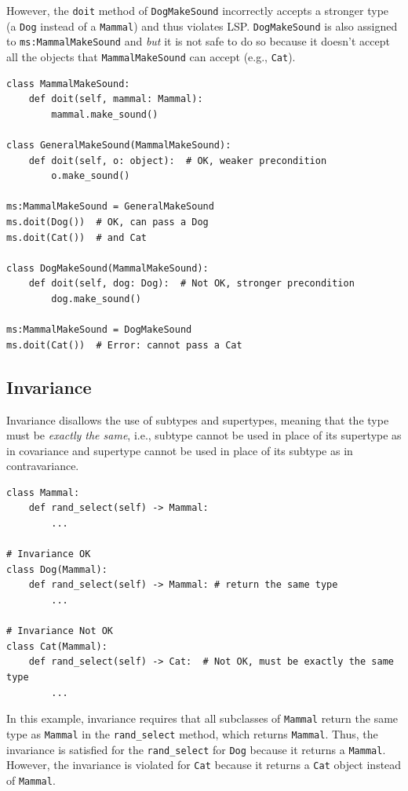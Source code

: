 \documentclass[oneside,11pt,dvipsnames]{book}
\newcommand{\code}[1]{\texttt{#1}}
\begin{document}
However, the \code{doit} method of \code{DogMakeSound} incorrectly accepts a stronger type (a \code{Dog} instead of a \code{Mammal}) and thus violates LSP. \code{DogMakeSound} is also assigned to \code{ms:MammalMakeSound} and \emph{but} it is not safe to do so because it doesn't accept all the objects that \code{MammalMakeSound} can accept (e.g., \code{Cat}).

\begin{lstlisting}
class MammalMakeSound:
    def doit(self, mammal: Mammal):
        mammal.make_sound()

class GeneralMakeSound(MammalMakeSound):
    def doit(self, o: object):  # OK, weaker precondition
        o.make_sound()

ms:MammalMakeSound = GeneralMakeSound
ms.doit(Dog())  # OK, can pass a Dog
ms.doit(Cat())  # and Cat
                
class DogMakeSound(MammalMakeSound):
    def doit(self, dog: Dog):  # Not OK, stronger precondition
        dog.make_sound()  

ms:MammalMakeSound = DogMakeSound
ms.doit(Cat())  # Error: cannot pass a Cat
\end{lstlisting}    

\subsection{Invariance}

Invariance disallows the use of subtypes and supertypes, meaning that the type must be \emph{exactly the same}, i.e., subtype cannot be used in place of its supertype as in covariance and supertype cannot be used in place of its subtype as in contravariance.


\begin{lstlisting}
class Mammal:
    def rand_select(self) -> Mammal:
        ...
       
# Invariance OK
class Dog(Mammal):    
    def rand_select(self) -> Mammal: # return the same type
        ...

# Invariance Not OK 
class Cat(Mammal):    
    def rand_select(self) -> Cat:  # Not OK, must be exactly the same type
        ...        
\end{lstlisting}

In this example, invariance requires that all subclasses of \code{Mammal} return the same type as \code{Mammal} in the \code{rand\_select} method, which returns \code{Mammal}. Thus, the invariance is satisfied for the \code{rand\_select} for \code{Dog} because it returns a \code{Mammal}. However, the invariance is violated for \code{Cat} because it returns a \code{Cat} object instead of \code{Mammal}.
\end{document}
